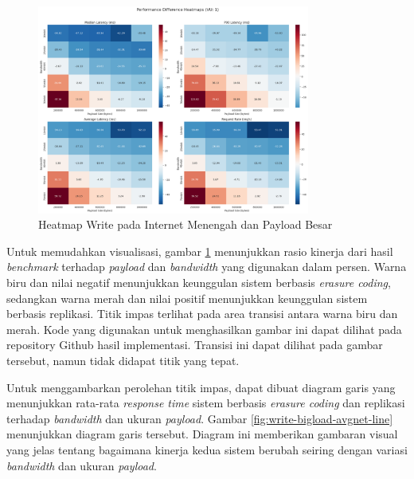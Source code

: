 \begin{enumerate}
  \begin{figure}[ht]
    \centering
    \includegraphics[width=0.8\textwidth]{resources/chapter-4/write_bigload_avgnet_heatmap.png}

    \caption{Heatmap Write pada Internet Menengah dan Payload Besar}
    \label{fig:write-bigload-avgnet-heatmap}
  \end{figure}

  Untuk memudahkan visualisasi, gambar \ref{fig:write-bigload-avgnet-heatmap} menunjukkan rasio kinerja dari hasil \textit{benchmark} terhadap \textit{payload} dan \textit{bandwidth} yang digunakan dalam persen. Warna biru dan nilai negatif menunjukkan keunggulan sistem berbasis \textit{erasure coding}, sedangkan warna merah dan nilai positif menunjukkan keunggulan sistem berbasis replikasi. Titik impas terlihat pada area transisi antara warna biru dan merah.  Kode yang digunakan untuk menghasilkan gambar ini dapat dilihat pada repository Github hasil implementasi. Transisi ini dapat dilihat pada gambar tersebut, namun tidak didapat titik yang tepat.

  Untuk menggambarkan perolehan titik impas, dapat dibuat diagram garis yang menunjukkan rata-rata \textit{response time} sistem berbasis \textit{erasure coding} dan replikasi terhadap \textit{bandwidth} dan ukuran \textit{payload}. Gambar \ref{fig:write-bigload-avgnet-line} menunjukkan diagram garis tersebut. Diagram ini memberikan gambaran visual yang jelas tentang bagaimana kinerja kedua sistem berubah seiring dengan variasi \textit{bandwidth} dan ukuran \textit{payload}.


\end{enumerate}
